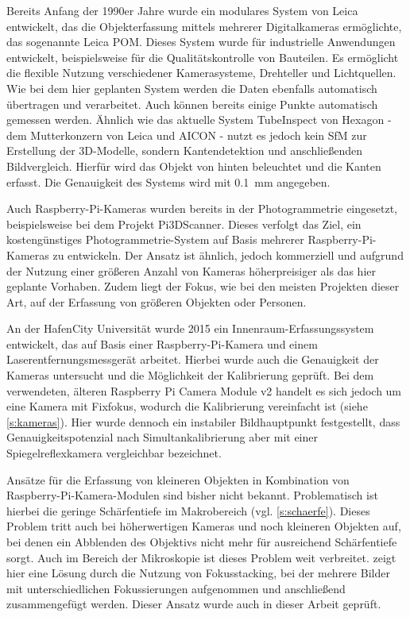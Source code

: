 \documentclass[./00PhotoBox]{subfiles}
\begin{document}
Bereits Anfang der 1990er Jahre wurde ein modulares System von Leica entwickelt, das die Objekterfassung mittels mehrerer Digitalkameras ermöglichte, das sogenannte Leica POM. Dieses System wurde für industrielle Anwendungen entwickelt, beispielsweise für die Qualitätskontrolle von Bauteilen. Es ermöglicht die flexible Nutzung verschiedener Kamerasysteme, Drehteller und Lichtquellen. Wie bei dem hier geplanten System werden die Daten ebenfalls au\-to\-ma\-tisch übertragen und verarbeitet. Auch können bereits einige Punkte au\-to\-ma\-tisch gemessen werden. Ähnlich wie das aktuelle System TubeInspect \citep[vgl.][]{aicon_tubeinspect} von Hexagon - dem Mutterkonzern von Leica und AICON - nutzt es jedoch kein \Gls{SfM} zur Erstellung der 3D-Modelle, sondern Kantendetektion und anschließenden Bildvergleich. Hierfür wird das Objekt von hinten beleuchtet und die Kanten erfasst. Die Genauigkeit des Systems wird mit \SI{0,1}{\milli\metre} angegeben.
\citep[vgl.][]{leica_pom_concept}

Auch Raspberry-Pi-Kameras wurden bereits in der Photogrammetrie eingesetzt, beispielsweise bei dem Projekt Pi3DScanner. Dieses verfolgt das Ziel, ein kostengünstiges Photo\-grammetrie-System auf Basis mehrerer Raspberry-Pi-Kameras zu entwickeln. Der Ansatz ist ähnlich, jedoch kommerziell und aufgrund der Nutzung einer größeren Anzahl von Kameras höherpreisiger als das hier geplante Vorhaben. Zudem liegt der Fokus, wie bei den meisten Projekten dieser Art, auf der Erfassung von größeren Objekten oder Personen.
\citep[vgl.][]{pi3dscanner}

An der HafenCity Universität wurde 2015 ein Innenraum-Erfassungssystem entwickelt, das auf Basis einer Raspberry-Pi-Kamera und einem Laserentfernungsmessgerät arbeitet. Hierbei wurde auch die Genauigkeit der Kameras untersucht und die Möglichkeit der Kalibrierung geprüft. Bei dem verwendeten, älteren Raspberry Pi Camera Module v2 handelt es sich jedoch um eine Kamera mit Fixfokus, wodurch die Kalibrierung vereinfacht ist (siehe \autoref{s:kameras}). Hier wurde dennoch ein instabiler \Gls{Bildhauptpunkt} festgestellt, dass Genauigkeitspotenzial nach Simultankalibrierung aber mit einer Spiegelreflexkamera vergleichbar bezeichnet.
\citep[vgl.][]{3d_raspi_laserscanner}

Ansätze für die Erfassung von kleineren Objekten in Kombination von Raspberry-Pi-Kamera-Modulen sind bisher nicht bekannt. Problematisch ist hierbei die geringe Schärfentiefe im Makrobereich (vgl. \autoref{s:schaerfe}). Dieses Problem tritt auch bei höherwertigen Kameras und noch kleineren Objekten auf, bei denen ein Abblenden des Objektivs nicht mehr für ausreichend Schärfentiefe sorgt. Auch im Bereich der Mikroskopie ist dieses Problem weit verbreitet. \citet{focusstack_sfm} zeigt hier eine Lösung durch die Nutzung von Fokusstacking, bei der mehrere Bilder mit unterschiedlichen Fokussierungen aufgenommen und anschließend zusammengefügt werden. Dieser Ansatz wurde auch in dieser Arbeit geprüft.
\end{document}
